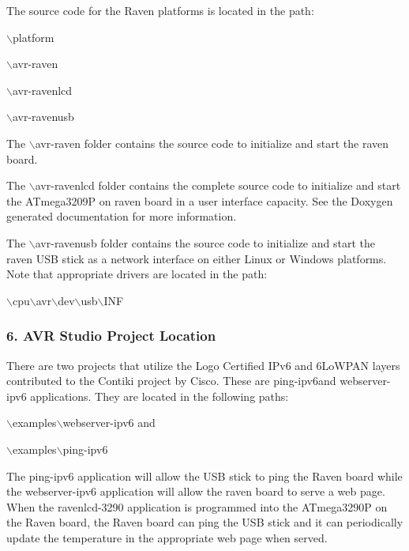 \-The source code for the \-Raven platforms is located in the path\-:
\begin{DoxyItemize}
\item $\backslash$platform
\begin{DoxyItemize}
\item $\backslash$avr-\/raven
\item $\backslash$avr-\/ravenlcd
\item $\backslash$avr-\/ravenusb
\end{DoxyItemize}
\end{DoxyItemize}
\begin{DoxyEnumerate}
\item \-The $\backslash$avr-\/raven folder contains the source code to initialize and start the raven board.
\item \-The $\backslash$avr-\/ravenlcd folder contains the complete source code to initialize and start the \-A\-Tmega3209\-P on raven board in a user interface capacity. \-See the \-Doxygen generated documentation for more information.
\item \-The $\backslash$avr-\/ravenusb folder contains the source code to initialize and start the raven \-U\-S\-B stick as a network interface on either \-Linux or \-Windows platforms. \-Note that appropriate drivers are located in the path\-:
\begin{DoxyItemize}
\item $\backslash$cpu$\backslash$avr$\backslash$dev$\backslash$usb$\backslash$\-I\-N\-F
\end{DoxyItemize}
\end{DoxyEnumerate}\hypertarget{a00055_macavrstudio}{}\subsubsection{6. A\-V\-R Studio Project Location}\label{a00055_macavrstudio}
\-There are two projects that utilize the \-Logo \-Certified \-I\-Pv6 and 6\-Lo\-W\-P\-A\-N layers contributed to the \-Contiki project by \-Cisco. \-These are ping-\/ipv6and webserver-\/ipv6 applications. \-They are located in the following paths\-:
\begin{DoxyItemize}
\item $\backslash$examples$\backslash$webserver-\/ipv6 and
\item $\backslash$examples$\backslash$ping-\/ipv6
\end{DoxyItemize}

\-The ping-\/ipv6 application will allow the \-U\-S\-B stick to ping the \-Raven board while the webserver-\/ipv6 application will allow the raven board to serve a web page. \-When the ravenlcd-\/3290 application is programmed into the \-A\-Tmega3290\-P on the \-Raven board, the \-Raven board can ping the \-U\-S\-B stick and it can periodically update the temperature in the appropriate web page when served. 